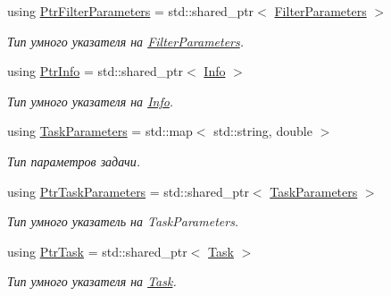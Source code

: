 \begin{DoxyCompactItemize}
using \hyperlink{namespace_core_a4811af8148ba137d644b9a61a042cf03}{Ptr\+Filter\+Parameters} = std\+::shared\+\_\+ptr$<$ \hyperlink{class_core_1_1_filter_parameters}{Filter\+Parameters} $>$
\begin{DoxyCompactList}\small\item\em Тип умного указателя на \hyperlink{class_core_1_1_filter_parameters}{Filter\+Parameters}. \end{DoxyCompactList}\item 
\hypertarget{namespace_core_a647483da8a1266d5bbd3e9bb5cd66d08}{}\label{namespace_core_a647483da8a1266d5bbd3e9bb5cd66d08} 
using \hyperlink{namespace_core_a647483da8a1266d5bbd3e9bb5cd66d08}{Ptr\+Info} = std\+::shared\+\_\+ptr$<$ \hyperlink{class_core_1_1_info}{Info} $>$
\begin{DoxyCompactList}\small\item\em Тип умного указателя на \hyperlink{class_core_1_1_info}{Info}. \end{DoxyCompactList}\item 
\hypertarget{namespace_core_a34db09964ddb6b4af04cc94b02a49e29}{}\label{namespace_core_a34db09964ddb6b4af04cc94b02a49e29} 
using \hyperlink{namespace_core_a34db09964ddb6b4af04cc94b02a49e29}{Task\+Parameters} = std\+::map$<$ std\+::string, double $>$
\begin{DoxyCompactList}\small\item\em Тип параметров задачи. \end{DoxyCompactList}\item 
\hypertarget{namespace_core_a3e0e555656bf795146ebb0882e28da2f}{}\label{namespace_core_a3e0e555656bf795146ebb0882e28da2f} 
using \hyperlink{namespace_core_a3e0e555656bf795146ebb0882e28da2f}{Ptr\+Task\+Parameters} = std\+::shared\+\_\+ptr$<$ \hyperlink{namespace_core_a34db09964ddb6b4af04cc94b02a49e29}{Task\+Parameters} $>$
\begin{DoxyCompactList}\small\item\em Тип умного указатель на Task\+Parameters. \end{DoxyCompactList}\item 
\hypertarget{namespace_core_abfda8f69fcacfcea2696549b548ed737}{}\label{namespace_core_abfda8f69fcacfcea2696549b548ed737} 
using \hyperlink{namespace_core_abfda8f69fcacfcea2696549b548ed737}{Ptr\+Task} = std\+::shared\+\_\+ptr$<$ \hyperlink{class_core_1_1_task}{Task} $>$
\begin{DoxyCompactList}\small\item\em Тип умного указателя на \hyperlink{class_core_1_1_task}{Task}. \end{DoxyCompactList}\end{DoxyCompactItemize}
